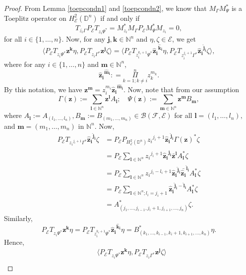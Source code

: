 \documentclass[12pt]{amsart}
\theoremstyle{definition}
\newcommand{\Nat}{\mathbb{N}}
\newcommand{\D}{\mathbb{D}}
\newcommand{\1}{{\mbox{\bf 1}}}
\newcommand{\clb}{\mathcal{B}}
\newcommand{\cle}{\mathcal{E}}
\newcommand{\clf}{\mathcal{F}}
\begin{document}
\begin{proof}
From Lemma \ref{toepcondn1} and \ref{toepcondn2}, we know that $M_{\Gamma}M_{\Psi}^*$ is a Toeplitz operator on $H_{\cle}^2(\D^n)$ if and only if
\[
T_{\overline{z_i} \Gamma} P_{\cle} T_{z_i \Psi^*} = M_{z_i}^* M_{\Gamma}P_{\cle} M_{\Psi}^* M_{z_i}=0,
\]
for all $i \in \{1,\ldots,n\}$. Now, for any $\bm{j},\bm{k} \in \Nat^n$ and $\eta, \zeta \in \cle$, we get
\[
\langle P_{\cle}  T_{z_i \Psi^*} \bm{z}^{\bm{k}} \eta, P_{\cle}  T_{z_i \Gamma^*} \bm{z}^{\bm{j}} \zeta \rangle = \langle P_{\cle}  T_{z_i^{k_i+1} \Psi^*} \bm{\hat{z}_i}^{\bm{\hat{k}_i}} \eta, P_{\cle} T_{z_i^{j_i+1} \Gamma^*} \bm{\hat{z}_i}^{\bm{\hat{j}_i}} \zeta \rangle,
\]
where for any $i \in \{1,\ldots,n\}$ and $\bm{m} \in \Nat^n$,
\[
\bm{\hat{z}_i}^{\bm{\hat{m}_i}}: =\underset{k=1; k \neq i}{ \overset{n}{\Pi}} z_k^{m_k}.
\]
By this notation, we have $\bm{z}^{\bm{m}} = z_i^{m_i} \bm{\hat{z}_i}^{\bm{\hat{m}_i}}$. Now, note that from our assumption
\[
\Gamma(\bm{z}):= \sum_{\bm{l} \in \Nat^n} \bm{z}^{\bm{l}} A_{\bm{l}}; \quad \Psi(\bm{z}):= \sum_{\bm{m} \in \Nat^n} \bm{z}^{\bm{m}} B_{\bm{m}},
\]
where $A_{\bm{l}}:= A_{(l_1, \ldots,l_n)}, B_{\bm{m}}:= B_{(m_1, \ldots,m_n)} \in \clb(\clf, \cle)$ for all $\bm{l} = (l_1, \ldots,l_n),$ and $\bm{m} = (m_1, \ldots,m_n)$ in $\Nat^n$.  Now,
\begin{align*}
P_{\cle} T_{{z_i}^{j_i+1} \Gamma^*} \bm{\hat{z}_i}^{\bm{\hat{j}_i}} \zeta 
&= P_{\cle} P_{H_{\cle}^2(\D^n)}{z_i}^{j_i+1}  \bm{\hat{z}_i}^{\bm{\hat{j}_i}}  \Gamma(\bm{z})^* \zeta \\
&= P_{\cle} \sum_{\bm{l} \in \Nat^n} {z_i}^{j_i+1} \bm{\hat{z}_i}^{\bm{\hat{j}_i}} \bar{\bm{z}}^{\bm{l}} A_{\bm{l}}^* \zeta \\
&= P_{\cle} \sum_{\bm{l} \in \Nat^n} {z_i}^{j_i - l_i +1} \bm{\hat{z}_i}^{\bm{\hat{j}_i}} \bar{\bm{\hat{z}_i}}^{\bm{\hat{l}_i}} A_{\bm{l}}^* \zeta \\
&= P_{\cle} \sum_{\bm{l} \in \Nat^n; l_i = j_i + 1} \bm{\hat{z}_i}^{\bm{\hat{j}_i - \hat{l}_i}}  A_{\bm{l}}^* \zeta \\
&=  A_{(j_1, \ldots, j_{i-1}, j_{i}+1, j_{i+1}, \ldots, j_n)}^* \zeta.
\end{align*}
Similarly, 
\[
P_{\cle}  T_{z_i \Psi^*} \bm{z}^{\bm{k}}  \eta = P_{\cle}  T_{z_i^{k_i+1} \Psi^*} \bm{\hat{z}_i}^{\bm{\hat{k}_i}} \eta = B_{(k_1,\ldots, k_{i-1}, k_i+1,k_{i+1}, \ldots, k_n)}^* \eta.
\]
Hence, 
\begin{align*}
&\langle P_{\cle}  T_{z_i \Psi^*} \bm{z}^{\bm{k}} \eta, P_{\cle}  T_{z_i \Gamma^*} \bm{z}^{\bm{j}} \zeta \rangle \\

\end{align*}
\end{proof}
\end{document}
